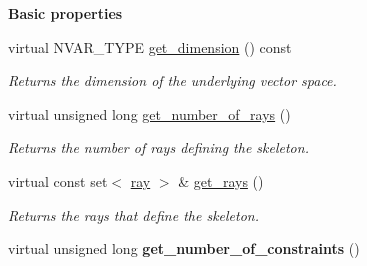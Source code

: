 \begin{Indent}\textbf{ Basic properties}\par
\begin{DoxyCompactItemize}
\item 
\mbox{\label{class_g_l_p_k___solver_aa7ea7b9f4bb731fcb3b48991d33efe0a}} 
virtual N\+V\+A\+R\+\_\+\+T\+Y\+PE \hyperlink{class_g_l_p_k___solver_aa7ea7b9f4bb731fcb3b48991d33efe0a}{get\+\_\+dimension} () const
\begin{DoxyCompactList}\small\item\em Returns the dimension of the underlying vector space. \end{DoxyCompactList}\item 
\mbox{\label{class_g_l_p_k___solver_ae687af797043acd0e7621e75dd97b37a}} 
virtual unsigned long \hyperlink{class_g_l_p_k___solver_ae687af797043acd0e7621e75dd97b37a}{get\+\_\+number\+\_\+of\+\_\+rays} ()
\begin{DoxyCompactList}\small\item\em Returns the number of rays defining the skeleton. \end{DoxyCompactList}\item 
\mbox{\label{class_g_l_p_k___solver_abd6239c7b6c914ba4c30e357d9fbc59c}} 
virtual const set$<$ \hyperlink{classray}{ray} $>$ \& \hyperlink{class_g_l_p_k___solver_abd6239c7b6c914ba4c30e357d9fbc59c}{get\+\_\+rays} ()
\begin{DoxyCompactList}\small\item\em Returns the rays that define the skeleton. \end{DoxyCompactList}\item 
\mbox{\label{class_g_l_p_k___solver_a714f9e1e02b53d1a785297e86567b133}} 
virtual unsigned long {\bfseries get\+\_\+number\+\_\+of\+\_\+constraints} ()
\end{DoxyCompactItemize}
\end{Indent}
